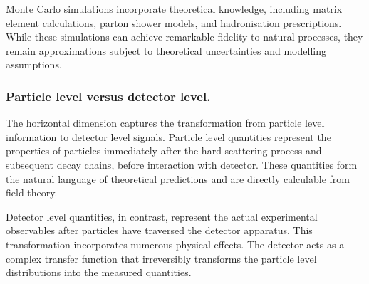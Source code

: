 \begin{definition}
        Monte Carlo simulations incorporate theoretical knowledge, including matrix element calculations, parton shower models, and hadronisation prescriptions.
        While these simulations can achieve remarkable fidelity to natural processes, they remain approximations subject to theoretical uncertainties and modelling assumptions.

    \subsubsection{Particle level versus detector level.}
        The horizontal dimension captures the transformation from particle level information to detector level signals.
        Particle level quantities represent the properties of particles immediately after the hard scattering process and subsequent decay chains, before interaction with detector.
        These quantities form the natural language of theoretical predictions and are directly calculable from field theory.

        Detector level quantities, in contrast, represent the actual experimental observables after particles have traversed the detector apparatus.
        This transformation incorporates numerous physical effects.
        The detector acts as a complex transfer function that irreversibly transforms the particle level distributions into the measured quantities.


\end{definition}
